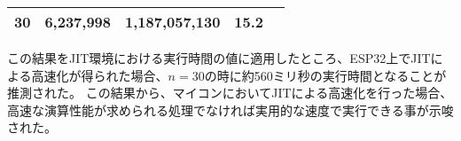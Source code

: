 \begin{table}[htbp]
\begin{center}
\begin{tabular}{rrrrr}
      30 & 6,237,998 & 1,187,057,130 & 15.2 \\ \hline
    \end{tabular}
  \end{center}
\end{table}

この結果をJIT環境における実行時間の値に適用したところ、ESP32上でJITによる高速化が得られた場合、$n=30$の時に約560ミリ秒の実行時間となることが推測された。
この結果から、マイコンにおいてJITによる高速化を行った場合、高速な演算性能が求められる処理でなければ実用的な速度で実行できる事が示唆された。

